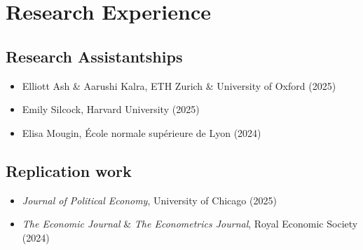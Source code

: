 \documentclass{cv_style}
\begin{document}
	
	
		
	\section{Research Experience}

        \subsection{Research Assistantships}


		\begin{itemize}
                \item Elliott Ash \& Aarushi Kalra, ETH Zurich \& University of Oxford (2025\textendash)
                \item Emily Silcock, Harvard University (2025\textendash)
			\item Elisa Mougin, École normale supérieure de Lyon (2024)
		\end{itemize}
        
        \subsection{Replication work}
        
        \begin{itemize}
            \item \textit{Journal of Political Economy}, University of Chicago (2025\textendash)
            \item \textit{The Economic Journal} \& \textit{The Econometrics Journal}, Royal Economic Society (2024)
        \end{itemize}
		
\end{document}
